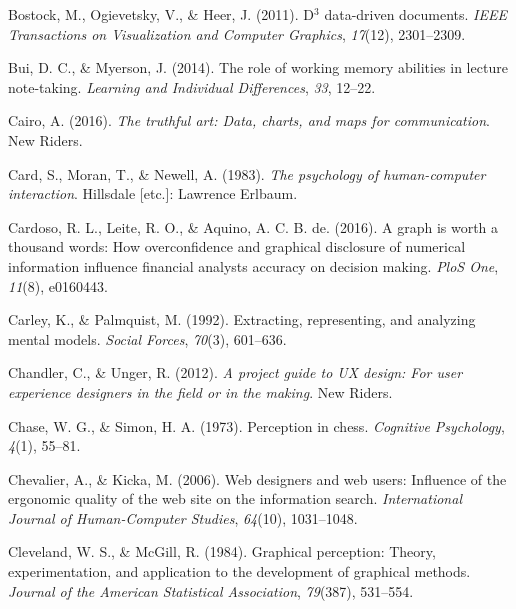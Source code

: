 \documentclass[print]{nuthesis}
\newlength{\cslhangindent}
\newenvironment{CSLReferences}[2]%
{\setlength{\parindent}{0pt}%
\everypar{\setlength{\hangindent}{\cslhangindent}}\ignorespaces}%
{\par}
\begin{document}
\begin{CSLReferences}{1}{0}
\leavevmode{}%
Bostock, M., Ogievetsky, V., \& Heer, J. (2011). D\(^3\) data-driven documents. \emph{IEEE Transactions on Visualization and Computer Graphics}, \emph{17}(12), 2301--2309.

\leavevmode{}%
Bui, D. C., \& Myerson, J. (2014). The role of working memory abilities in lecture note-taking. \emph{Learning and Individual Differences}, \emph{33}, 12--22.

\leavevmode{}%
Cairo, A. (2016). \emph{The truthful art: Data, charts, and maps for communication}. New Riders.

\leavevmode{}%
Card, S., Moran, T., \& Newell, A. (1983). \emph{The psychology of human-computer interaction}. Hillsdale {[}etc.{]}: Lawrence Erlbaum.

\leavevmode{}%
Cardoso, R. L., Leite, R. O., \& Aquino, A. C. B. de. (2016). A graph is worth a thousand words: How overconfidence and graphical disclosure of numerical information influence financial analysts accuracy on decision making. \emph{PloS One}, \emph{11}(8), e0160443.

\leavevmode{}%
Carley, K., \& Palmquist, M. (1992). Extracting, representing, and analyzing mental models. \emph{Social Forces}, \emph{70}(3), 601--636.

\leavevmode{}%
Chandler, C., \& Unger, R. (2012). \emph{A project guide to UX design: For user experience designers in the field or in the making}. New Riders.

\leavevmode{}%
Chase, W. G., \& Simon, H. A. (1973). Perception in chess. \emph{Cognitive Psychology}, \emph{4}(1), 55--81.

\leavevmode{}%
Chevalier, A., \& Kicka, M. (2006). Web designers and web users: Influence of the ergonomic quality of the web site on the information search. \emph{International Journal of Human-Computer Studies}, \emph{64}(10), 1031--1048.

\leavevmode{}%
Cleveland, W. S., \& McGill, R. (1984). Graphical perception: Theory, experimentation, and application to the development of graphical methods. \emph{Journal of the American Statistical Association}, \emph{79}(387), 531--554.


\end{CSLReferences}
\end{document}
